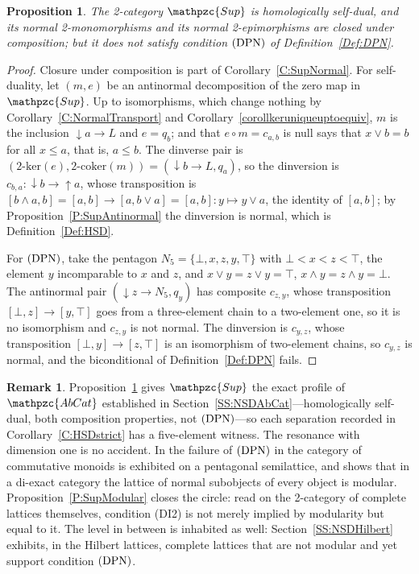\documentclass[reqno,a4paper]{amsart}
\numberwithin{equation}{section}
\theoremstyle{plain}
\newtheorem{proposition}[subsection]{Proposition}
\theoremstyle{definition}
\newtheorem{remark}[subsection]{Remark}
\def\nameit#1{\textrm{#1}~}
\def\prox{\nameit{Proposition}}
\def\corx{\nameit{Corollary}}
\def\defx{\nameit{Definition}}
\newcommand{\comp}{\circ}
\newcommand{\catfont}[1]{\ensuremath{\mathpzc{#1}}\xspace}
\newcommand{\AbCat}{\catfont{AbCat}}
\newcommand{\Sup}{\catfont{Sup}}
\renewcommand{\1}{\onecat{1}}
\newcommand{\dseg}[1]{\ensuremath{{\downarrow}#1}}
\newcommand{\useg}[1]{\ensuremath{{\uparrow}#1}}
\newcommand{\DPN}{\textup{(DPN)}}
\newcommand{\twoker}{\ensuremath{2\text{-}\mathrm{ker}}}
\newcommand{\twocoker}{\ensuremath{2\text{-}\mathrm{coker}}}
\begin{document}
\begin{proposition}\label{P:SupNotDPN}
	The 2-category \(\Sup\) is homologically self-dual, and its normal 2-monomorphisms and its normal 2-epimorphisms are closed under composition; but it does not satisfy condition \(\DPN\) of \defx\ref{Def:DPN}.
\end{proposition}

\begin{proof}
	Closure under composition is part of \corx\ref{C:SupNormal}. For self-duality, let \((m,e)\) be an antinormal decomposition of the zero map in \(\Sup\). Up to isomorphisms, which change nothing by \corx\ref{C:NormalTransport} and \corx\ref{corollkeruniqueuptoequiv}, \(m\) is the inclusion \(\dseg{a}\to L\) and \(e=q_{b}\); and that \(e\comp m=c_{a,b}\) is null says that \(x\vee b=b\) for all \(x\leq a\), that is, \(a\leq b\). The dinverse pair is \((\twoker(e),\twocoker(m))=(\dseg{b}\to L,q_{a})\), so the dinversion is \(c_{b,a}\colon\dseg{b}\to\useg{a}\), whose transposition is \([b\wedge a,b]=[a,b]\to[a,b\vee a]=[a,b]\colon y\mapsto y\vee a\), the identity of \([a,b]\); by \prox\ref{P:SupAntinormal} the dinversion is normal, which is \defx\ref{Def:HSD}.

	For \(\DPN\), take the pentagon \(N_{5}=\{\bot,x,z,y,\top\}\) with \(\bot<x<z<\top\), the element \(y\) incomparable to \(x\) and \(z\), and \(x\vee y=z\vee y=\top\), \(x\wedge y=z\wedge y=\bot\). The antinormal pair \((\dseg{z}\to N_{5},q_{y})\) has composite \(c_{z,y}\), whose transposition \([\bot,z]\to[y,\top]\) goes from a three-element chain to a two-element one, so it is no isomorphism and \(c_{z,y}\) is not normal. The dinversion is \(c_{y,z}\), whose transposition \([\bot,y]\to[z,\top]\) is an isomorphism of two-element chains, so \(c_{y,z}\) is normal, and the biconditional of \defx\ref{Def:DPN} fails.
\end{proof}

\begin{remark}\label{Rem Lattice Profile}
	\prox\ref{P:SupNotDPN} gives \(\Sup\) the exact profile of \(\AbCat\) established in Section~\ref{SS:NSDAbCat}---homologically self-dual, both composition properties, not \(\DPN\)---so each separation recorded in \corx\ref{C:HSDstrict} has a five-element witness. The resonance with dimension one is no accident. In \cite[Example~4.2.1]{Afsa-24} the failure of \(\DPN\) in the category of commutative monoids is exhibited on a pentagonal semilattice, and \cite[Theorem~4.3.4]{Afsa-24} shows that in a di-exact category the lattice of normal subobjects of every object is modular. \prox\ref{P:SupModular} closes the circle: read on the 2-category of complete lattices themselves, condition \textup{(DI2)} is not merely implied by modularity but equal to it. The level in between is inhabited as well: Section~\ref{SS:NSDHilbert} exhibits, in the Hilbert lattices, complete lattices that are not modular and yet support condition \(\DPN\).
\end{remark}
\end{document}
